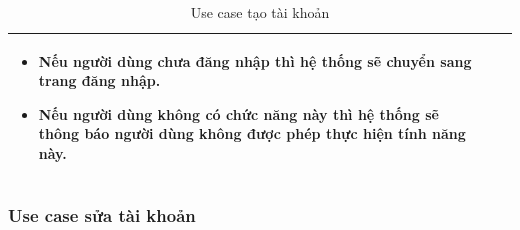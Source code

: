 \documentclass[12pt,a4paper]{article}
\begin{document}
\begin{table}[H]
\begin{tabular}{|p{3.5cm}|p{11.5cm}|c|}
            \vspace{-.8cm}\begin{itemize}
                              \item Nếu người dùng chưa đăng nhập thì hệ thống sẽ chuyển sang trang đăng nhập.
                              \item  Nếu người dùng không có chức năng này thì hệ thống sẽ thông báo người dùng không được phép thực hiện tính năng này.
            \end{itemize}
            \\
            \hline
        \end{tabular}
        \caption{Use case tạo tài khoản }
    \end{table}


    \subsubsection*{Use case sửa tài khoản }
\end{document}
